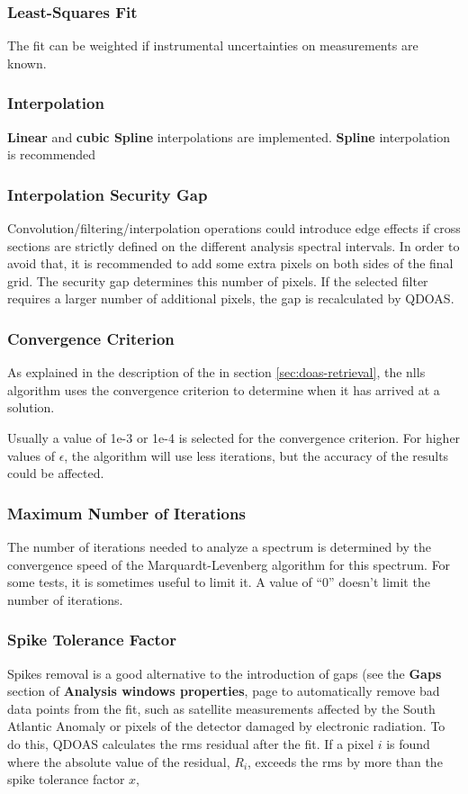 \subsubsection{Least-Squares Fit}
The fit can be weighted if instrumental uncertainties on measurements are known.

\subsubsection{Interpolation}
\textbf{Linear} and \textbf{cubic Spline} interpolations are implemented.  \textbf{Spline} interpolation is recommended

\subsubsection{Interpolation Security Gap}
Convolution/filtering/interpolation operations could introduce edge effects if cross sections are strictly defined on the different analysis spectral intervals. In order to avoid that, it is recommended to add some extra pixels on both sides of the final grid. The security gap determines this number of pixels. If the selected filter requires a larger number of additional pixels, the gap is recalculated by QDOAS.

\subsubsection{Convergence Criterion}\label{sec:conv-crit}
As explained in the description of the 
in section \ref{sec:doas-retrieval}, the \gls{nlls} algorithm uses the
convergence criterion to determine when it has arrived at a solution.

Usually a value of 1e-3 or 1e-4 is selected for the convergence
criterion.  For higher values of $\epsilon$, the algorithm will use
less iterations, but the accuracy of the results could be affected.

\subsubsection{Maximum Number of Iterations}
The number of iterations needed to analyze a spectrum is determined by the convergence speed of the Marquardt-Levenberg algorithm for this spectrum. For some tests, it is sometimes useful to limit it. A value of ``0'' doesn't limit the number of iterations.

\subsubsection{Spike Tolerance Factor} \label{sec:projects_analysis_spikes}
Spikes removal is a good alternative to the introduction of gaps (see the \textbf{Gaps} section of \textbf{Analysis windows properties}, page \pageref{sec:analysis_gaps_page} to automatically remove bad data points from the fit, such as
satellite measurements affected by the South Atlantic Anomaly or pixels of the detector damaged by electronic radiation.  To do this, QDOAS calculates the \gls{rms} residual after
the fit.  If a pixel $i$ is found where the absolute value of the
residual, $R_i$, exceeds the \gls{rms} by more than the spike
tolerance factor $x$,

